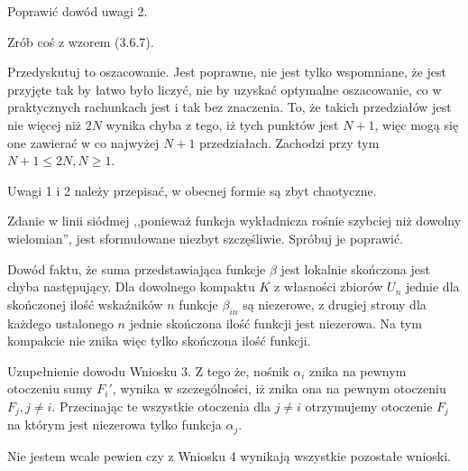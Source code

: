 \documentclass[a4paper,11pt]{article}
\begin{document}
\start {} Poprawić dowód uwagi 2.
  
\start {} Zrób coś z wzorem (3.6.7).
  
\start {} Przedyskutuj to oszacowanie. Jest poprawne, nie jest
tylko wspomniane, że jest przyjęte tak by łatwo było liczyć, nie by
uzyskać optymalne oszacowanie, co w praktycznych rachunkach jest i tak
bez znaczenia. To, że takich przedziałów jest nie więcej niż $2N$
wynika chyba z tego, iż tych punktów jest $N+1$, więc mogą się one
zawierać w co najwyżej $N + 1$ przedziałach. Zachodzi przy tym
$N + 1 \leq 2 N, N \geq 1$.

\start {} Uwagi 1 i 2 należy przepisać, w obecnej formie są
zbyt chaotyczne.

\start {} Zdanie w linii siódmej ,,ponieważ funkcja wykładnicza
rośnie szybciej niż dowolny wielomian'', jest sformułowane niezbyt
szczęśliwie. Spróbuj je poprawić.

\start {} Dowód faktu, że suma przedstawiająca funkcje $\beta$
jest lokalnie skończona jest chyba następujący. Dla dowolnego kompaktu
$K$ z własności zbiorów $U_{ n }$ jednie dla skończonej ilość
wskaźników $n$ funkcje $\beta_{ i n }$ są niezerowe, z drugiej strony
dla każdego ustalonego $n$ jednie skończona ilość funkcji jest
niezerowa. Na tym kompakcie nie znika więc tylko skończona ilość
funkcji.

\start {} Uzupełnienie dowodu Wniosku 3. Z tego że, nośnik
$\alpha_{ i }$ znika na pewnym otoczeniu sumy $F_{ i }'$, wynika w
szczególności, iż znika ona na pewnym otoczeniu $F_{ j }, j \neq i$.
Przecinając te wszystkie otoczenia dla $j \neq i$ otrzymujemy
otoczenie $F_{ j }$ na którym jest niezerowa tylko funkcja
$\alpha_{ j }$.

\start {} Nie jestem wcale pewien czy z Wniosku 4 wynikają
wszystkie pozostałe wnioski.
\end{document}
